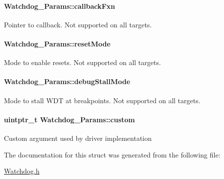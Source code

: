 \paragraph[{callback\+Fxn}]{ Watchdog\+\_\+\+Params\+::callback\+Fxn}\label{struct_watchdog___params_a710aaa2504356ab3d3f9a27ac19ddb85}
Pointer to callback. Not supported on all targets. 
\paragraph[{reset\+Mode}]{ Watchdog\+\_\+\+Params\+::reset\+Mode}\label{struct_watchdog___params_a94b5d650f8beb7dce719360404039ccf}
Mode to enable resets. Not supported on all targets. 
\paragraph[{debug\+Stall\+Mode}]{ Watchdog\+\_\+\+Params\+::debug\+Stall\+Mode}\label{struct_watchdog___params_abe7792eef8afa2972a4625f428b7241b}
Mode to stall W\+D\+T at breakpoints. Not supported on all targets. 
\paragraph[{custom}]{\setlength{\rightskip}{0pt plus 5cm}uintptr\+\_\+t Watchdog\+\_\+\+Params\+::custom}\label{struct_watchdog___params_aa3c851cbea7d70fe033250ce64add537}
Custom argument used by driver implementation 

The documentation for this struct was generated from the following file\+:\begin{DoxyCompactItemize}
\item 
\hyperlink{_watchdog_8h}{Watchdog.\+h}\end{DoxyCompactItemize}
